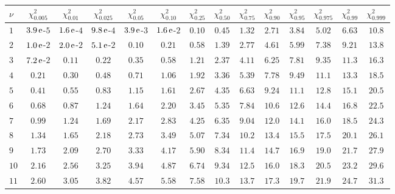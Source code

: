
\begin{table}[htb!]
\begin{center}
{\scriptsize
\renewcommand\arraystretch{1.250000}
\begin{tabular}{p{22 pt}ccccccccccccc}
\hline

\rule[-2pt]{0pt}{14pt}$\nu$ & $\chi^2_{0.005}$ & $\chi^2_{0.01}$ & $\chi^2_{0.025}$ & $\chi^2_{0.05}$ & $\chi^2_{0.10}$ & $\chi^2_{0.25}$ & $\chi^2_{0.50}$ & $\chi^2_{0.75}$ & $\chi^2_{0.90}$ & $\chi^2_{0.95}$ & $\chi^2_{0.975}$ & $\chi^2_{0.99}$ & $\chi^2_{0.999}$\\
\hline
\hline
\rule[0pt]{0pt}{15pt}$1$ & $3.9\,{\rm e}$-$5$ & $1.6\,{\rm e}$-$4$ & $9.8\,{\rm e}$-$4$ & $3.9\,{\rm e}$-$3$ & $1.6\,{\rm e}$-$2$ & $0.10$ & $0.45$ & $1.32$ & $2.71$ & $3.84$ & $5.02$ & $6.63$ & $10.8$\\
$2$ & $1.0\,{\rm e}$-$2$ & $2.0\,{\rm e}$-$2$ & $5.1\,{\rm e}$-$2$ & $0.10$ & $0.21$ & $0.58$ & $1.39$ & $2.77$ & $4.61$ & $5.99$ & $7.38$ & $9.21$ & $13.8$\\
$3$ & $7.2\,{\rm e}$-$2$ & $0.11$ & $0.22$ & $0.35$ & $0.58$ & $1.21$ & $2.37$ & $4.11$ & $6.25$ & $7.81$ & $9.35$ & $11.3$ & $16.3$\\
$4$ & $0.21$ & $0.30$ & $0.48$ & $0.71$ & $1.06$ & $1.92$ & $3.36$ & $5.39$ & $7.78$ & $9.49$ & $11.1$ & $13.3$ & $18.5$\\
$5$ & $0.41$ & $0.55$ & $0.83$ & $1.15$ & $1.61$ & $2.67$ & $4.35$ & $6.63$ & $9.24$ & $11.1$ & $12.8$ & $15.1$ & $20.5$\\
$6$ & $0.68$ & $0.87$ & $1.24$ & $1.64$ & $2.20$ & $3.45$ & $5.35$ & $7.84$ & $10.6$ & $12.6$ & $14.4$ & $16.8$ & $22.5$\\
$7$ & $0.99$ & $1.24$ & $1.69$ & $2.17$ & $2.83$ & $4.25$ & $6.35$ & $9.04$ & $12.0$ & $14.1$ & $16.0$ & $18.5$ & $24.3$\\
$8$ & $1.34$ & $1.65$ & $2.18$ & $2.73$ & $3.49$ & $5.07$ & $7.34$ & $10.2$ & $13.4$ & $15.5$ & $17.5$ & $20.1$ & $26.1$\\
$9$ & $1.73$ & $2.09$ & $2.70$ & $3.33$ & $4.17$ & $5.90$ & $8.34$ & $11.4$ & $14.7$ & $16.9$ & $19.0$ & $21.7$ & $27.9$\\
$10$ & $2.16$ & $2.56$ & $3.25$ & $3.94$ & $4.87$ & $6.74$ & $9.34$ & $12.5$ & $16.0$ & $18.3$ & $20.5$ & $23.2$ & $29.6$\\
$11$ & $2.60$ & $3.05$ & $3.82$ & $4.57$ & $5.58$ & $7.58$ & $10.3$ & $13.7$ & $17.3$ & $19.7$ & $21.9$ & $24.7$ & $31.3$\\

\end{tabular}}
\end{center}
\end{table}
